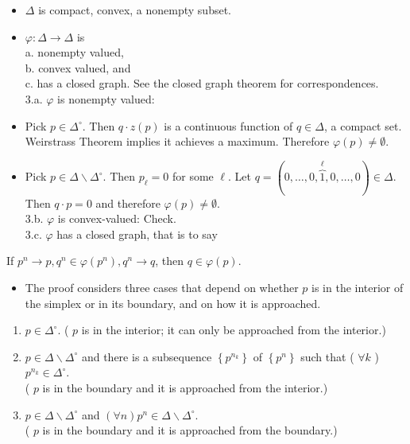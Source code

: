 \documentclass[10pt]{article}
\begin{document}
\begin{itemize}
  \item $\Delta$ is compact, convex, a nonempty subset.
  \item $\varphi: \Delta \rightarrow \Delta$ is\\
a. nonempty valued,\\
b. convex valued, and\\
c. has a closed graph. See the closed graph theorem for correspondences.\\
3.a. $\varphi$ is nonempty valued:
  \item Pick $p \in \Delta^{\circ}$. Then $q \cdot z(p)$ is a continuous function of $q \in \Delta$, a compact set. Weirstrass Theorem implies it achieves a maximum. Therefore $\varphi(p) \neq \emptyset$.
  \item Pick $p \in \Delta \backslash \Delta^{\circ}$. Then $p_{\ell}=0$ for some $\ell$. Let $q =(0, \ldots, 0, \overbrace{1}^{\ell}, 0, \ldots, 0) \in \Delta$. Then $q \cdot p=0$ and therefore $\varphi(p) \neq \emptyset$.\\
3.b. $\varphi$ is convex-valued: Check.\\
3.c. $\varphi$ has a closed graph, that is to say
\end{itemize}

If $p^{n} \rightarrow p, q^{n} \in \varphi\left(p^{n}\right), q^{n} \rightarrow q$, then $q \in \varphi(p)$.

\begin{itemize}
  \item The proof considers three cases that depend on whether $p$ is in the interior of the simplex or in its boundary, and on how it is approached.
\end{itemize}

\begin{enumerate}
  \item $p \in \Delta^{\circ}$. ( $p$ is in the interior; it can only be approached from the interior.)
  \item $p \in \Delta \backslash \Delta^{\circ}$ and there is a subsequence $\left\{p^{n_{k}}\right\}$ of $\left\{p^{n}\right\}$ such that ( $\forall k$ ) $p^{n_{k}} \in \Delta^{\circ}$.\\
( $p$ is in the boundary and it is approached from the interior.)
  \item $p \in \Delta \backslash \Delta^{\circ}$ and $(\forall n) p^{n} \in \Delta \backslash \Delta^{\circ}$.\\
( $p$ is in the boundary and it is approached from the boundary.)
\end{enumerate}
\end{document}
